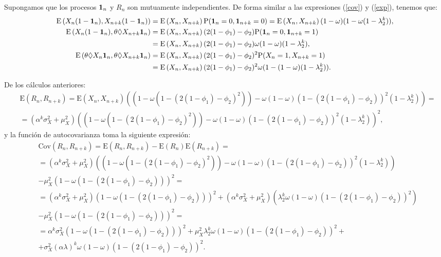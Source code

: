 \documentclass[12pt,twoside]{article} %
\begin{document}
Supongamos que los procesos ${\bf 1}_n$ y $R_n$ son mutuamente independientes. De forma similar a las expresiones (\ref{cov}) y (\ref{exp}), tenemos que:
{\small \begin{align*}
\textrm{E}\left(X_n(1-{\bf 1}_n),X_{n+k}({1-\bf 1}_n)\right)&=\textrm{E}\left(X_n,X_{n+k}\right)\textrm{P}({\bf 1}_n=0,{\bf 1}_{n+k}=0)=\textrm{E}\left(X_n,X_{n+k}\right)(1-\omega)(1-\omega(1-\lambda_2^k)),\\
\textrm{E}\left(X_n(1-{\bf 1}_n),\theta \Diamond X_{n+k}{\bf 1}_n\right)&=\textrm{E}\left(X_n,X_{n+k}\right)(2(1-\phi_1)-\phi_2)\textrm{P}({\bf 1}_n=0,{\bf 1}_{n+k}=1)\\&=\textrm{E}\left(X_n,X_{n+k}\right)(2(1-\phi_1)-\phi_2)\omega(1-\omega)(1-\lambda_2^k),\\
\textrm{E}\left(\theta \Diamond X_n{\bf 1}_n,\theta \Diamond X_{n+k}{\bf 1}_n\right)&=\textrm{E}\left(X_n,X_{n+k}\right)(2(1-\phi_1)-\phi_2)^2\textrm{P}(X_n=1, X_{n+k}=1)\\ &=\textrm{E}\left(X_n,X_{n+k}\right)(2(1-\phi_1)-\phi_2)^2\omega(1-(1-\omega)(1-\lambda_2^k)).
\end{align*}}

\noindent De los cálculos anteriores:
\begin{align*}
&\textrm{E}(R_n,R_{n+k})=\textrm{E}(X_n,X_{n+k})\left(\left(1-\omega\left(1-(2(1-\phi_1)-\phi_2)^2\right)\right)-\omega(1-\omega)(1-(2(1-\phi_1)-\phi_2))^2(1-\lambda_2^k)\right)=\\
&=(\alpha^k\sigma_X^2+\mu_X^2)\left(\left(1-\omega\left(1-(2(1-\phi_1)-\phi_2)^2\right)\right)- \omega(1-\omega)(1-(2(1-\phi_1)-\phi_2))^2(1-\lambda_2^k)\right)^2,
\end{align*}
y la función de autocovarianza toma la siguiente expresión:
\begin{align*}
&\textrm{Cov}(R_n,R_{n+k})=\textrm{E}(R_n,R_{n+k})-\textrm{E}(R_n)\textrm{E}(R_{n+k})=\\&=(\alpha^k\sigma_X^2+\mu_X^2)\left(\left(1-\omega\left(1-(2(1-\phi_1)-\phi_2)^2\right)\right)-\omega(1-\omega)(1-(2(1-\phi_1)-\phi_2))^2(1-\lambda_2^k)\right)\\ &- \mu_X^2\left(1-\omega\left(1-\left(2(1-\phi_1)-\phi_2\right)\right)\right)^2=\\&=(\alpha^k\sigma_X^2+\mu_X^2)\left(1-\omega\left(1-\left(2(1-\phi_1)-\phi_2\right)\right)\right)^2+(\alpha^k\sigma_X^2+\mu_X^2)\left(\lambda_2^k\omega(1-\omega)(1-\left(2(1-\phi_1)-\phi_2\right))^2\right)\\&-\mu_X^2\left(1-\omega\left(1-\left(2(1-\phi_1)-\phi_2\right)\right)\right)^2=\\&=\alpha^k\sigma_X^2\left(1-\omega\left(1-\left(2(1-\phi_1)-\phi_2\right)\right)\right)^2+\mu_X^2\lambda_2^k\omega(1-\omega)(1-\left(2(1-\phi_1)-\phi_2\right))^2+\\&+\sigma_X^2(\alpha\lambda)^k\omega(1-\omega)(1-\left(2(1-\phi_1)-\phi_2\right))^2. 
\end{align*}
\end{document}
